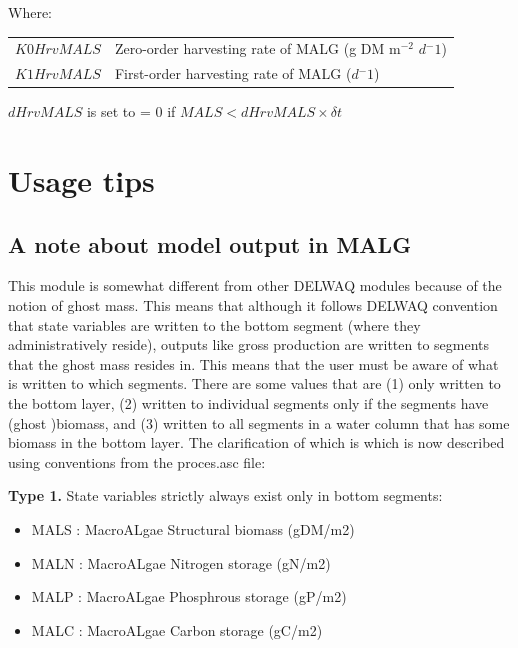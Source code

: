 \documentclass{deltares_manual}
\begin{document}
Where:\\

\begin{tabular}{ll}
	$K0HrvMALS$ & Zero-order harvesting rate of MALG (g DM m$^{-2}$ $d{^-1}$)\\
	$K1HrvMALS$ & First-order harvesting rate of MALG ($d{^-1}$)\\
\end{tabular}

$dHrvMALS$ is set to = 0 if $MALS < dHrvMALS\times \delta t$
 
\pagebreak

\chapter{Usage tips}
\section{A note about model output in MALG}
This module is somewhat different from other DELWAQ modules because of the notion of ghost mass. This means that although it follows DELWAQ convention that state variables are written to the bottom segment (where they administratively reside), outputs like gross production are written to segments that the ghost mass resides in. This means that the user must be aware of what is written to which segments. There are some values that are (1) only written to the bottom layer, (2) written to individual segments only if the segments have (ghost )biomass, and (3) written to all segments in a water column that has some biomass in the bottom layer. The clarification of which is which is now described using conventions from the proces.asc file:

\textbf{Type 1.} State variables strictly always exist only in bottom segments:
\begin{itemize}
	\item MALS     : MacroALgae Structural biomass                          (gDM/m2)        
	\item MALN     : MacroALgae Nitrogen storage                            (gN/m2)       
	\item MALP     : MacroALgae Phosphrous storage                          (gP/m2)       
	\item MALC     : MacroALgae Carbon storage                              (gC/m2)  
\end{itemize}
\end{document}
